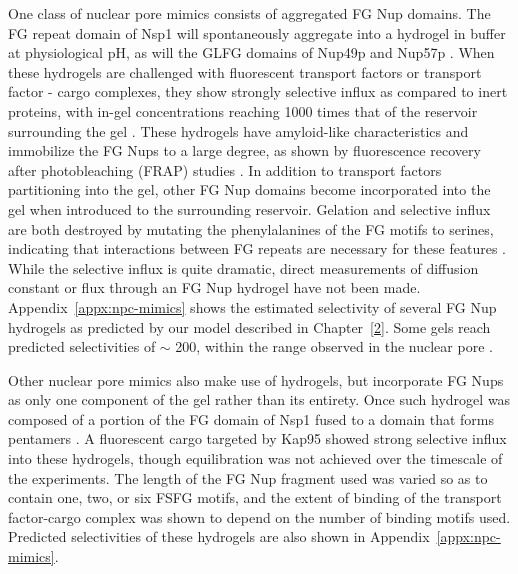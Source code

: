 
One class of nuclear pore mimics consists of aggregated FG Nup domains.  The FG repeat domain of Nsp1 will spontaneously aggregate into a hydrogel in buffer at physiological pH, as will the GLFG domains of Nup49p and Nup57p \cite{frey06,frey09}.  When these hydrogels are challenged with fluorescent transport factors or transport factor - cargo complexes, they show strongly selective influx as compared to inert proteins, with in-gel concentrations reaching 1000 times that of the reservoir surrounding the gel \cite{frey07}.  These hydrogels have amyloid-like characteristics and immobilize the FG Nups to a large degree, as shown by fluorescence recovery after photobleaching (FRAP) studies \cite{ader10,frey06}.  In addition to transport factors partitioning into the gel, other FG Nup domains become incorporated into the gel when introduced to the surrounding reservoir.  Gelation and selective influx are both destroyed by mutating the phenylalanines of the FG motifs to serines, indicating that interactions between FG repeats are necessary for these features \cite{frey07}.   While the selective influx is quite dramatic, direct measurements of diffusion constant or flux through an FG Nup hydrogel have not been made.  Appendix~\ref{appx:npc-mimics} shows the estimated selectivity of several FG Nup hydrogels as predicted by our model described in Chapter~\ref{2}.  Some gels reach predicted selectivities of $\sim$ 200, within the range observed in the nuclear pore \cite{ribbeck01, siebrasse02, kiskin03}.

Other nuclear pore mimics also make use of hydrogels, but incorporate FG Nups as only one component of the gel rather than its entirety.  Once such hydrogel was composed of a portion of the FG domain of Nsp1 fused to a domain that forms pentamers \cite{kim15}.  A fluorescent cargo targeted by Kap95 showed strong selective influx into these hydrogels, though equilibration was not achieved over the timescale of the experiments.  The length of the FG Nup fragment used was varied so as to contain one, two, or six FSFG motifs, and the extent of binding of the transport factor-cargo complex was shown to depend on the number of binding motifs used.  Predicted selectivities of these hydrogels are also shown in Appendix~\ref{appx:npc-mimics}.

